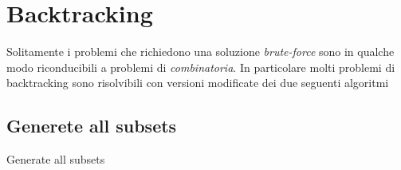 \section{Backtracking}
Solitamente i problemi che richiedono una soluzione \textit{brute-force} sono in qualche modo riconducibili a problemi di \textit{combinatoria}. In particolare molti problemi di backtracking sono risolvibili con versioni modificate dei due seguenti algoritmi
\vskip3mm
\subsection{Generete all subsets}
\begin{algoritmo}{Generate all subsets}
	\begin{algorithm}[H]
		\caption{Print Subsets of a Set (Recursive)}


	\end{algorithm}\label{sottoinsiemi}
\end{algoritmo}

